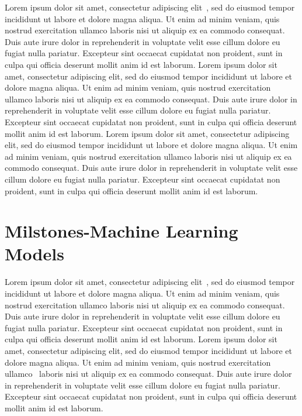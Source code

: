 \documentclass[letterpaper, 10 pt, conference]{ieeeconf}  %
\begin{document}
Lorem ipsum dolor sit amet, consectetur adipiscing elit~\cite{Cite13}, sed do eiusmod tempor incididunt ut labore et dolore magna aliqua. Ut enim ad minim veniam, quis nostrud exercitation ullamco laboris nisi ut aliquip ex ea commodo consequat. Duis aute irure dolor in reprehenderit in voluptate velit esse cillum dolore eu fugiat nulla pariatur. Excepteur sint occaecat cupidatat non proident, sunt in culpa qui officia deserunt mollit anim id est laborum. Lorem ipsum dolor sit amet, consectetur adipiscing elit, sed do eiusmod tempor incididunt ut labore et dolore magna aliqua. Ut enim ad minim veniam, quis nostrud exercitation ullamco laboris nisi ut aliquip ex ea commodo consequat. Duis aute irure dolor in reprehenderit in voluptate velit esse cillum dolore eu fugiat nulla pariatur. Excepteur sint occaecat cupidatat non proident, sunt in culpa qui officia deserunt mollit anim id est laborum. Lorem ipsum dolor sit amet, consectetur adipiscing elit, sed do eiusmod tempor incididunt ut labore et dolore magna aliqua. Ut enim ad minim veniam, quis nostrud exercitation ullamco laboris nisi ut aliquip ex ea commodo consequat. Duis aute irure dolor in reprehenderit in voluptate velit esse cillum dolore eu fugiat nulla pariatur. Excepteur sint occaecat cupidatat non proident, sunt in culpa qui officia deserunt mollit anim id est laborum.

\section{Milstones-Machine Learning Models}

Lorem ipsum dolor sit amet, consectetur adipiscing elit~\cite{Cite14}, sed do eiusmod tempor incididunt ut labore et dolore magna aliqua. Ut enim ad minim veniam, quis nostrud exercitation ullamco laboris nisi ut aliquip ex ea commodo consequat. Duis aute irure dolor in reprehenderit in voluptate velit esse cillum dolore eu fugiat nulla pariatur. Excepteur sint occaecat cupidatat non proident, sunt in culpa qui officia deserunt mollit anim id est laborum. Lorem ipsum dolor sit amet, consectetur adipiscing elit, sed do eiusmod tempor incididunt ut labore et dolore magna aliqua. Ut enim ad minim veniam, quis nostrud exercitation ullamco~\cite{Cite15} laboris nisi ut aliquip ex ea commodo consequat. Duis aute irure dolor in reprehenderit in voluptate velit esse cillum dolore eu fugiat nulla pariatur. Excepteur sint occaecat cupidatat non proident, sunt in culpa qui officia deserunt mollit anim id est laborum.
\end{document}

